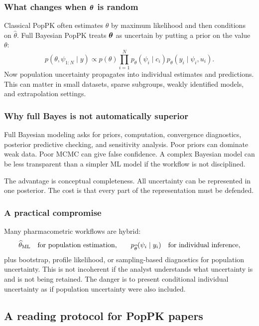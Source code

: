 \subsubsection*{What changes when \(\boldsymbol{\theta}\) is random}

Classical PopPK often estimates \(\theta\) by maximum likelihood and then conditions on \(\widehat\theta\).  Full Bayesian PopPK treats \(\boldsymbol{\theta}\) as uncertain by putting a prior on the value \(\theta\):
\[
  p(\theta,\psi_{1:N}\mid y)
  \propto
  p(\theta)
  \prod_{i=1}^N
  p_\theta(\psi_i\mid c_i)
  p_\theta(y_i\mid\psi_i,u_i).
\]
Now population uncertainty propagates into individual estimates and predictions.  This can matter in small datasets, sparse subgroups, weakly identified models, and extrapolation settings.

\subsubsection*{Why full Bayes is not automatically superior}

Full Bayesian modeling asks for priors, computation, convergence diagnostics, posterior predictive checking, and sensitivity analysis.  Poor priors can dominate weak data.  Poor MCMC can give false confidence.  A complex Bayesian model can be less transparent than a simpler ML model if the workflow is not disciplined.

The advantage is conceptual completeness.  All uncertainty can be represented in one posterior.  The cost is that every part of the representation must be defended.

\subsubsection*{A practical compromise}

Many pharmacometric workflows are hybrid:
\[
  \widehat\theta_{\mathrm{ML}}
  \quad\text{for population estimation,}
  \qquad
  p_{\widehat\theta}(\psi_i\mid y_i)
  \quad\text{for individual inference,}
\]
plus bootstrap, profile likelihood, or sampling-based diagnostics for population uncertainty.  This is not incoherent if the analyst understands what uncertainty is and is not being retained.  The danger is to present conditional individual uncertainty as if population uncertainty were also included.

\subsection{A reading protocol for PopPK papers}

